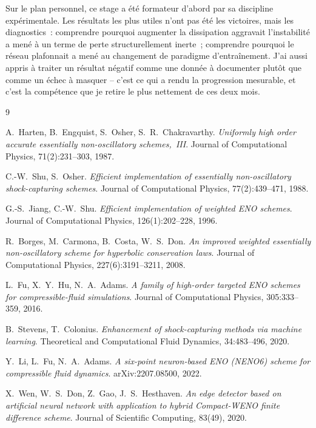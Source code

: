 \documentclass[12pt,a4paper,oneside]{report}
\begin{document}
Sur le plan personnel, ce stage a été formateur d'abord par sa discipline
expérimentale. Les résultats les plus utiles n'ont pas été les victoires, mais
les diagnostics~: comprendre pourquoi augmenter la dissipation aggravait
l'instabilité a mené à un terme de perte structurellement inerte~; comprendre
pourquoi le réseau plafonnait a mené au changement de paradigme d'entraînement.
J'ai aussi appris à traiter un résultat négatif comme une donnée à documenter
plutôt que comme un échec à masquer -- c'est ce qui a rendu la progression
mesurable, et c'est la compétence que je retire le plus nettement de ces deux
mois.

\begin{thebibliography}{9}

A.~Harten, B.~Engquist, S.~Osher, S.~R.~Chakravarthy.
\emph{Uniformly high order accurate essentially non-oscillatory schemes,~III}.
Journal of Computational Physics, 71(2):231--303, 1987.

C.-W.~Shu, S.~Osher.
\emph{Efficient implementation of essentially non-oscillatory shock-capturing
schemes}.
Journal of Computational Physics, 77(2):439--471, 1988.

G.-S.~Jiang, C.-W.~Shu.
\emph{Efficient implementation of weighted ENO schemes}.
Journal of Computational Physics, 126(1):202--228, 1996.

R.~Borges, M.~Carmona, B.~Costa, W.~S.~Don.
\emph{An improved weighted essentially non-oscillatory scheme for hyperbolic
conservation laws}.
Journal of Computational Physics, 227(6):3191--3211, 2008.

L.~Fu, X.~Y.~Hu, N.~A.~Adams.
\emph{A family of high-order targeted ENO schemes for compressible-fluid
simulations}.
Journal of Computational Physics, 305:333--359, 2016.

B.~Stevens, T.~Colonius.
\emph{Enhancement of shock-capturing methods via machine learning}.
Theoretical and Computational Fluid Dynamics, 34:483--496, 2020.

Y.~Li, L.~Fu, N.~A.~Adams.
\emph{A six-point neuron-based ENO (NENO6) scheme for compressible fluid
dynamics}.
arXiv:2207.08500, 2022.

X.~Wen, W.~S.~Don, Z.~Gao, J.~S.~Hesthaven.
\emph{An edge detector based on artificial neural network with application to
hybrid Compact-WENO finite difference scheme}.
Journal of Scientific Computing, 83(49), 2020.


\end{thebibliography}
\end{document}

